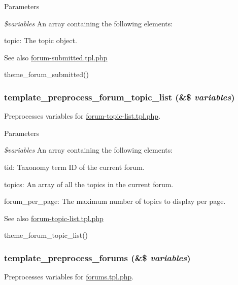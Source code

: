 \begin{DoxyParams}{Parameters}
\item[{\em \$variables}]An array containing the following elements:
\begin{DoxyItemize}
\item topic: The topic object.
\end{DoxyItemize}\end{DoxyParams}
\begin{DoxySeeAlso}{See also}
\hyperlink{forum-submitted_8tpl_8php}{forum-\/submitted.tpl.php} 

theme\_\-forum\_\-submitted() 
\end{DoxySeeAlso}
\hypertarget{forum_8module_a1030c21aad210d17887edaea6a5aeb28}{
\subsubsection[{template\_\-preprocess\_\-forum\_\-topic\_\-list}]{\setlength{\rightskip}{0pt plus 5cm}template\_\-preprocess\_\-forum\_\-topic\_\-list (\&\$ {\em variables})}}
\label{forum_8module_a1030c21aad210d17887edaea6a5aeb28}
Preprocesses variables for \hyperlink{forum-topic-list_8tpl_8php}{forum-\/topic-\/list.tpl.php}.


\begin{DoxyParams}{Parameters}
\item[{\em \$variables}]An array containing the following elements:
\begin{DoxyItemize}
\item tid: Taxonomy term ID of the current forum.
\item topics: An array of all the topics in the current forum.
\item forum\_\-per\_\-page: The maximum number of topics to display per page.
\end{DoxyItemize}\end{DoxyParams}
\begin{DoxySeeAlso}{See also}
\hyperlink{forum-topic-list_8tpl_8php}{forum-\/topic-\/list.tpl.php} 

theme\_\-forum\_\-topic\_\-list() 
\end{DoxySeeAlso}
\hypertarget{forum_8module_ad752c10d673b2b4e95fc5e3c9847dd24}{
\subsubsection[{template\_\-preprocess\_\-forums}]{\setlength{\rightskip}{0pt plus 5cm}template\_\-preprocess\_\-forums (\&\$ {\em variables})}}
\label{forum_8module_ad752c10d673b2b4e95fc5e3c9847dd24}
Preprocesses variables for \hyperlink{forums_8tpl_8php}{forums.tpl.php}.


